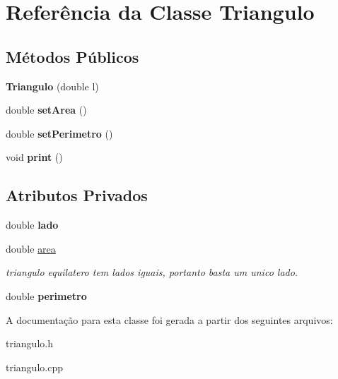 \hypertarget{classTriangulo}{}\section{Referência da Classe Triangulo}
\label{classTriangulo}
\subsection*{Métodos Públicos}
\begin{DoxyCompactItemize}
\item 
{\bfseries Triangulo} (double l)\hypertarget{classTriangulo_aacd24c54dec4e4ab69d3e12e80f8c172}{}\label{classTriangulo_aacd24c54dec4e4ab69d3e12e80f8c172}

\item 
double {\bfseries set\+Area} ()\hypertarget{classTriangulo_afe07f979ef46f9a579e1390d61c95e1a}{}\label{classTriangulo_afe07f979ef46f9a579e1390d61c95e1a}

\item 
double {\bfseries set\+Perimetro} ()\hypertarget{classTriangulo_a6abf8444c79c53951b61cb9baf6d1e6b}{}\label{classTriangulo_a6abf8444c79c53951b61cb9baf6d1e6b}

\item 
void {\bfseries print} ()\hypertarget{classTriangulo_ac898c5b210b9d9b0d44e932578f8e21b}{}\label{classTriangulo_ac898c5b210b9d9b0d44e932578f8e21b}

\end{DoxyCompactItemize}
\subsection*{Atributos Privados}
\begin{DoxyCompactItemize}
\item 
double {\bfseries lado}\hypertarget{classTriangulo_a031445887d0161d7ffb7b9338ae3c715}{}\label{classTriangulo_a031445887d0161d7ffb7b9338ae3c715}

\item 
double \hyperlink{classTriangulo_a7c272d5536b605370cb7ecd8a0c26d08}{area}\hypertarget{classTriangulo_a7c272d5536b605370cb7ecd8a0c26d08}{}\label{classTriangulo_a7c272d5536b605370cb7ecd8a0c26d08}

\begin{DoxyCompactList}\small\item\em triangulo equilatero tem lados iguais, portanto basta um unico lado. \end{DoxyCompactList}\item 
double {\bfseries perimetro}\hypertarget{classTriangulo_afb3326a460dc259a32bddb59cdc106a4}{}\label{classTriangulo_afb3326a460dc259a32bddb59cdc106a4}

\end{DoxyCompactItemize}


A documentação para esta classe foi gerada a partir dos seguintes arquivos\+:\begin{DoxyCompactItemize}
\item 
triangulo.\+h\item 
triangulo.\+cpp\end{DoxyCompactItemize}
